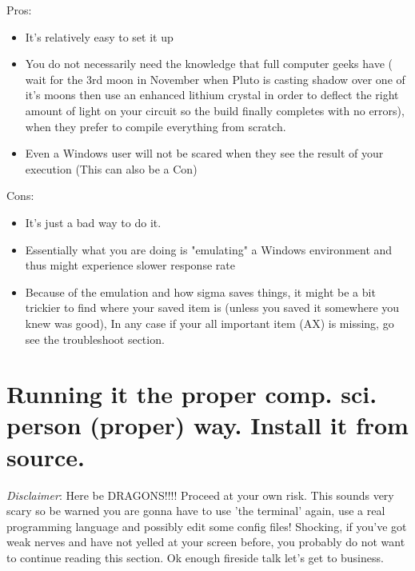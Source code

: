 \documentclass[11pt,a4paper]{article}
\begin{document}
 Pros:
\begin{itemize}
    \item It's relatively easy to set it up
    \item You do not necessarily need the knowledge that full computer geeks have ( wait for the 3rd moon in November when Pluto is casting shadow over one of it's moons then use an enhanced lithium crystal in order to deflect the right amount of light on your circuit so the build finally completes with no errors), when they prefer to compile everything from scratch.
    \item Even a Windows user will not be scared when they see the result of your execution (This can also be a Con)
\end{itemize}

 Cons:
 \begin{itemize}
     \item It's just a bad way to do it.
     \item Essentially what you are doing is "emulating" a Windows environment and thus might experience slower response rate
     \item Because of the emulation and how sigma saves things, it might be a bit trickier to find where your saved item is (unless you saved it somewhere you knew was good), In any case if your all important item (AX) is missing, go see the troubleshoot section.
 \end{itemize}


\section{Running it the proper comp. sci. person (proper) way. Install it from source.}
\textit{Disclaimer}:
 Here be DRAGONS!!!! Proceed at your own risk. This sounds very scary so be warned you are gonna have to use 'the terminal' again, use a real programming language and possibly edit some config files! Shocking, if you've got weak nerves and have not yelled at your screen before, you probably do not want to continue reading this section. Ok enough fireside talk let's get to business.
\end{document}
